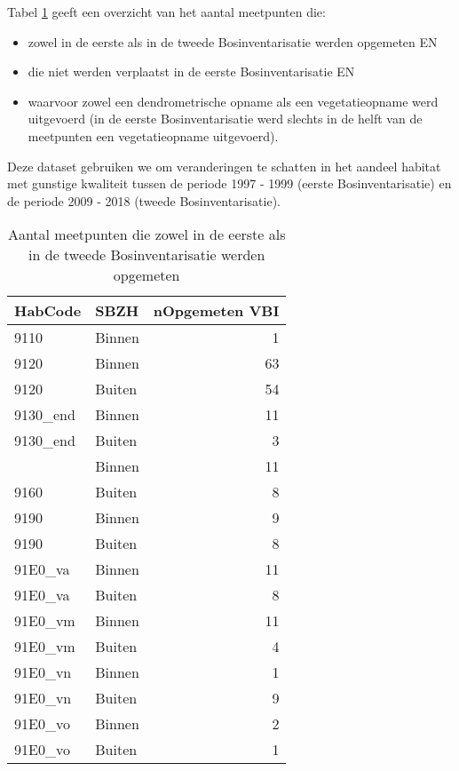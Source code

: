 \documentclass[twoside]{extreport}
\begin{document}
Tabel \ref{tab:BosTrends} geeft een overzicht van het aantal meetpunten
die:

\begin{itemize}
\tightlist
\item
  zowel in de eerste als in de tweede Bosinventarisatie werden opgemeten
  EN
\item
  die niet werden verplaatst in de eerste Bosinventarisatie EN
\item
  waarvoor zowel een dendrometrische opname als een vegetatieopname werd
  uitgevoerd (in de eerste Bosinventarisatie werd slechts in de helft
  van de meetpunten een vegetatieopname uitgevoerd).
\end{itemize}

Deze dataset gebruiken we om veranderingen te schatten in het aandeel
habitat met gunstige kwaliteit tussen de periode 1997 - 1999 (eerste
Bosinventarisatie) en de periode 2009 - 2018 (tweede Bosinventarisatie).

\begin{table}[t]

\caption{\label{tab:BosTrends}Aantal meetpunten die zowel in de eerste als in de tweede Bosinventarisatie werden opgemeten}
\centering
\begin{tabular}{llr}
\toprule
HabCode & SBZH & nOpgemeten VBI\\
\midrule
9110 & Binnen & 1\\
9120 & Binnen & 63\\
9120 & Buiten & 54\\
9130\_end & Binnen & 11\\
9130\_end & Buiten & 3\\
\addlinespace
9160 & Binnen & 11\\
9160 & Buiten & 8\\
9190 & Binnen & 9\\
9190 & Buiten & 8\\
91E0\_va & Binnen & 11\\
\addlinespace
91E0\_va & Buiten & 8\\
91E0\_vm & Binnen & 11\\
91E0\_vm & Buiten & 4\\
91E0\_vn & Binnen & 1\\
91E0\_vn & Buiten & 9\\
\addlinespace
91E0\_vo & Binnen & 2\\
91E0\_vo & Buiten & 1\\
\bottomrule
\end{tabular}
\end{table}
\end{document}
